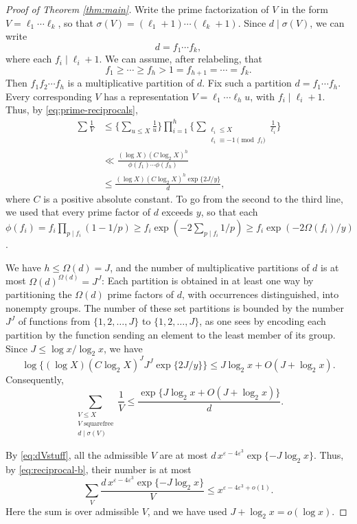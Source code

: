 \documentclass[11pt]{amsart}
\begin{document}
\begin{proof}[Proof of Theorem \ref{thm:main}]
Write the prime factorization of $V$ in the form
$V=\ell_1\cdots\ell_k$, so that
$\sigma(V)=(\ell_1+1)\cdots(\ell_k+1)$. Since $d\mid\sigma(V)$,
we can write
\[
 d=f_1\cdots f_k,
\]
where each $f_i\mid\ell_i+1$. We can assume, after relabeling, that
\[
 f_1\ge\cdots\ge f_h>1=f_{h+1}=\cdots=f_k.
\]
Then $f_1f_2\cdots f_h$ is a multiplicative partition of $d$.
Fix such a partition $d=f_1\cdots f_h$.
Every corresponding $V$ has a representation
$V=\ell_1\cdots\ell_hu$, with $f_i\mid\ell_i+1$.
Thus, by \eqref{eq:prime-reciprocals},
\[
\begin{aligned}
 \sum\frac1V
 &\le\Bigg\{\sum_{u\le X}\frac1u\Bigg\}
 \prod_{i=1}^h
 \Bigg\{\sum_{\substack{\ell_i\le X\\
                       \ell_i\equiv-1\pmod{f_i}}}\frac1{\ell_i}\Bigg\}\\
 &\ll\frac{(\log X)(C\log_2 X)^h}
          {\phi(f_1)\cdots\phi(f_h)}\\
 &\le\frac{(\log X)(C\log_2 X)^h\exp\{2J/y\}}d,
\end{aligned}
\]
where $C$ is a positive absolute constant. To go from the second to the third line, we used that every prime factor of $d$ exceeds $y$, so that each $\phi(f_i) = f_i \prod_{p \mid f_i}(1-1/p) \ge f_i \exp(-2\sum_{p \mid f_i} 1/p) \ge f_i \exp(-2\Omega(f_i)/y)$.

We have $h\le\Omega(d)=J$, and the number of multiplicative
partitions of $d$ is at most $\Omega(d)^{\Omega(d)}=J^J$: Each partition is obtained in at least one way by partitioning the
$\Omega(d)$ prime factors of $d$, with occurrences
distinguished, into nonempty groups. The number of these set partitions is bounded by the number $J^J$ of functions from $\{1,2,\dots,J\}$ to $\{1,2,\dots,J\}$, as one sees by encoding each partition by the function sending an element to the least member of its group. Since $J\le\log x/\log_2 x$, we have
\[
 \log\{(\log X)(C\log_2 X)^J J^J\exp\{2J/y\}\}
 \le J\log_2 x+O(J+\log_2 x).
\]
Consequently,
\begin{equation}\label{eq:reciprocal-b}
 \sum_{\substack{V\le X\\V\text{ squarefree}\\d\mid\sigma(V)}}\frac1V
 \le\frac{\exp\{J\log_2 x+O(J+\log_2 x)\}}d.
\end{equation}

By \eqref{eq:dVstuff}, all the admissible $V$ are at most
$d\,x^{\varepsilon-4\varepsilon^3}\exp\{-J\log_2 x\}$. Thus, by \eqref{eq:reciprocal-b}, their number is at most
\[ \sum_{V} \frac{d\,x^{\varepsilon-4\varepsilon^3}\exp\{-J\log_2 x\}}{V} \le x^{\varepsilon-4\varepsilon^3+o(1)}.
\]
Here the sum is over admissible \(V\), and we have used \(J+\log_2 x=o(\log x)\).


\end{proof}
\end{document}
